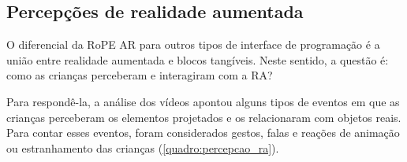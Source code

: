 
\subsection{Percepções de realidade aumentada}

O diferencial da RoPE AR para outros tipos de interface de programação é a união entre realidade aumentada e blocos tangíveis. Neste sentido, a questão é: como as crianças perceberam e interagiram com a RA?

Para respondê-la, a análise dos vídeos apontou alguns tipos de eventos em que as crianças perceberam os elementos projetados e os relacionaram com objetos reais. Para contar esses eventos, foram considerados gestos, falas e reações de animação ou estranhamento das crianças (\autoref{quadro:percepcao_ra}).


